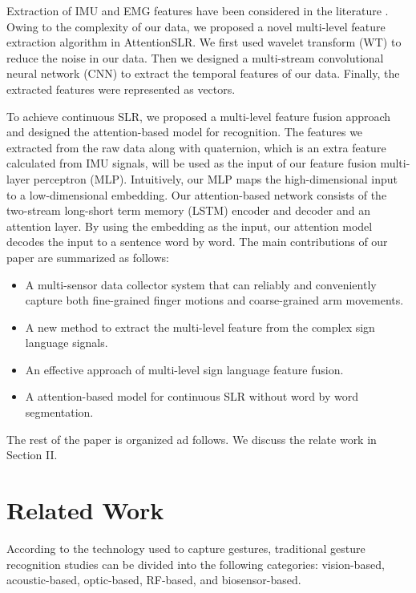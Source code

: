 \documentclass[10pt, conference, letterpaper]{IEEEtran}
\begin{document}
Extraction of IMU and EMG features have been considered in the literature \cite{kosmidou2006evaluation, khushaba2007channel, mantyjarvi2004enabling, kela2006accelerometer}. Owing to the complexity of our data, we proposed a novel multi-level feature extraction algorithm in AttentionSLR. We first used wavelet transform (WT) to reduce the noise in our data. Then we designed a multi-stream convolutional neural network (CNN) to extract the temporal features of our data. Finally, the extracted features were represented as vectors.

To achieve continuous SLR, we proposed a multi-level feature fusion approach and designed the attention-based model for recognition. The features we extracted from the raw data along with quaternion, which is an extra feature calculated from IMU signals, will be used as the input of our feature fusion multi-layer perceptron (MLP). Intuitively, our MLP maps the high-dimensional input to a low-dimensional embedding. Our attention-based network consists of 
the two-stream long-short term memory (LSTM) encoder and decoder and an attention layer. By using the embedding as the input, our attention model decodes the input to a sentence word by word. The main contributions of our paper are summarized as follows:
\begin{itemize}
  \item A multi-sensor data collector system that can reliably and conveniently capture both fine-grained finger motions and coarse-grained arm movements.
  \item A new method to extract the multi-level feature from the complex sign language signals.
  \item An effective approach of multi-level sign language feature fusion.
  \item A attention-based model for continuous SLR without word by word segmentation.
\end{itemize}

The rest of the paper is organized ad follows. We discuss the relate work in Section II.

\section{Related Work}
\label{sec:related_work}
According to the technology used to capture gestures, traditional gesture recognition studies can be divided into the following categories: vision-based, acoustic-based, optic-based, RF-based, and biosensor-based.
\end{document}
